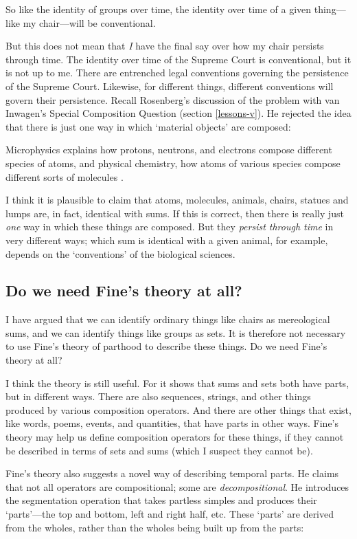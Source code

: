 \documentclass[11pt]{article}
\newenvironment{squote}{%
\begin{spacing}{1}
\begin{list}{}{%
\setlength{\labelwidth}{0pt}%
\rightmargin\leftmargin%
}
\item\relax
}{%
\end{list}%
\end{spacing}
}
\begin{document}
\begin{spacing}{1.5}
So like the identity of groups over time, the identity over time of a
given thing---like my chair---will be conventional.

But this does not mean that {\em I} have the final say over how my
chair persists through time.  The identity over time of the Supreme
Court is conventional, but it is not up to me.  There are entrenched
legal conventions governing the persistence of the Supreme Court.
Likewise, for different things, different conventions will govern
their persistence.  Recall Rosenberg's discussion of the problem with
van Inwagen's Special Composition Question (section \ref{lessons-v}).
He rejected the idea that there is just one way in which `material
objects' are composed:

\begin{squote}
Microphysics explains how protons, neutrons, and electrons compose
different species of atoms, and physical chemistry, how atoms of
various species compose different sorts of molecules
\citep[706]{rosenberg1993}.
\end{squote}

I think it is plausible to claim that atoms, molecules, animals,
chairs, statues and lumps are, in fact, identical with sums.  If this
is correct, then there is really just {\em one} way in which these
things are composed.  But they {\em persist through time} in very
different ways; which sum is identical with a given animal, for
example, depends on the `conventions' of the biological sciences.

\subsection{Do we need Fine's theory at all?}
I have argued that we can identify ordinary things like chairs as
mereological sums, and we can identify things like groups as sets.  It
is therefore not necessary to use Fine's theory of parthood to
describe these things.  Do we need Fine's theory at all?

I think the theory is still useful.  For it shows that sums and sets
both have parts, but in different ways.  There are also sequences,
strings, and other things produced by various composition operators.
And there are other things that exist, like words, poems, events, and
quantities, that have parts in other ways.  Fine's theory may help us
define composition operators for these things, if they cannot be
described in terms of sets and sums (which I suspect they cannot be).

Fine's theory also suggests a novel way of describing temporal parts.
He claims that not all operators are compositional; some are {\em
  decompositional}.  He introduces the segmentation operation that
takes partless simples and produces their `parts'---the top and
bottom, left and right half, etc.  These `parts' are derived from the
wholes, rather than the wholes being built up from the parts:


\end{spacing}
\end{document}
